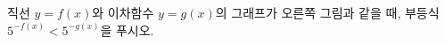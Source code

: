 \noindent\begin{minipage}[t]{0.58\linewidth}\vspace{0pt}\raggedright 직선 $y=f(x)$와 이차함수 $y=g(x)$의 그래프가 오른쪽 그림과 같을 때, 부등식 $5^{-f(x)}<5^{-g(x)}$을 푸시오.\end{minipage}\hfill\begin{minipage}[t]{0.4\linewidth}\vspace{0pt}\centering \resizebox{\ifdim\width>\linewidth\linewidth\else\width\fi}{!}{}\end{minipage}\par
